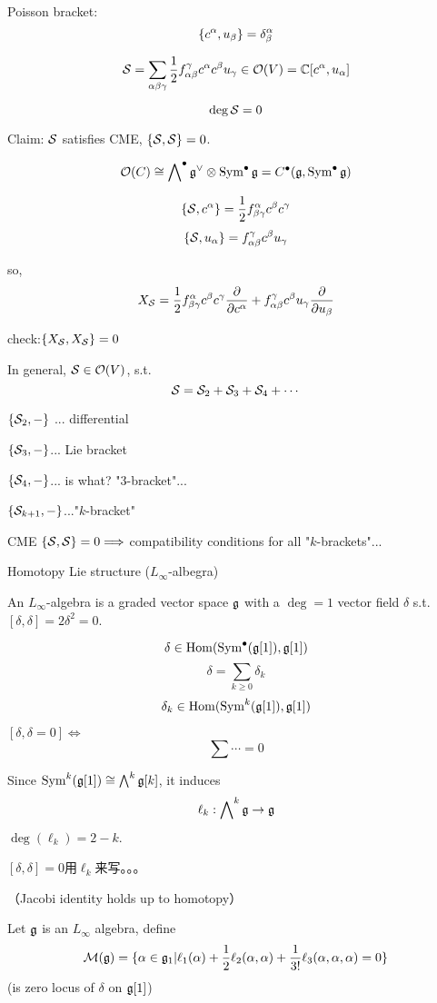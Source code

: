Poisson bracket:
$$\{c^\alpha,u_\beta\}=\delta^\alpha_\beta$$

$$\mathcal{S}=\sum_{\alpha\beta\gamma}
\frac{1}{2}f_{\alpha\beta}^\gamma c^\alpha c^\beta u_\gamma
\in\mathcal{O}(V)=\mathbb{C}[c^\alpha,u_\alpha]
$$

$$\deg\mathcal{S}=0$$

Claim: $\mathcal{S}$ satisfies CME, $\{\mathcal{S},\mathcal{S}\}=0$.

$$\mathcal{O}(C)\cong \bigwedge\nolimits^{\bullet}\mathfrak{g}^\vee\otimes\operatorname{Sym}^{\bullet}\mathfrak{g}
=C^{\bullet}(\mathfrak{g},\operatorname{Sym}^{\bullet}\mathfrak{g})
$$

$$\{\mathcal{S},c^\alpha\}=\frac{1}{2}f^\alpha_{\beta\gamma}c^\beta c^\gamma$$
$$\{\mathcal{S},u_\alpha\}=f^\gamma_{\alpha\beta}c^\beta u_\gamma$$

so,
$$X_{\mathcal{S}}=\frac{1}{2}f^\alpha_{\beta\gamma}c^\beta c^\gamma\frac{\partial } {\partial c^\alpha}
+f^\gamma_{\alpha\beta}c^\beta u_\gamma\frac{\partial } {\partial u_\beta}
$$

check:$\{X_{\mathcal{S}},X_{\mathcal{S}}\}=0$
\vs

In general, $\mathcal{S}\in\mathcal{O}(V)$, s.t.
$$\mathcal{S}=\mathcal{S}_2+\mathcal{S}_3+\mathcal{S}_4+\cdots$$

$\{\mathcal{S}_2,-\}$ ... differential

$\{\mathcal{S}_3,-\}$... Lie bracket

$\{\mathcal{S}_4,-\}$... is what? "3-bracket"...

$\{\mathcal{S}_{k+1},-\}$..."$k$-bracket"

CME $\{\mathcal{S},\mathcal{S}\}=0\Longrightarrow$ compatibility conditions for all "$k$-brackets"...

Homotopy Lie structure ($L_\infty$-albegra)

\begin{definition}
An $L_\infty$-algebra is a graded vector space $\mathfrak{g}$ with
a $\deg=1$ vector field $\delta$ s.t. $[\delta,\delta]=2\delta^2=0$.
\end{definition}
$$\delta\in\operatorname{Hom}(\operatorname{Sym}^{\bullet}(\mathfrak{g}[1]),\mathfrak{g}[1])$$
$$\delta=\sum_{k\geq 0}\delta_k$$
$$\delta_k\in\operatorname{Hom}(\operatorname{Sym}^k(\mathfrak{g}[1]),\mathfrak{g}[1])$$

$[\delta,\delta=0]\iff$
$$\sum\cdots=0$$

Since $\operatorname{Sym}^k(\mathfrak{g}[1])\cong\bigwedge\nolimits^{k}\mathfrak{g}[k]$, it induces
$$\ell_k:\bigwedge\nolimits^{k}\mathfrak{g}\to\mathfrak{g}$$
$\deg(\ell_k)=2-k$.

$[\delta,\delta]=0$用$\ell_k$来写。。。

（Jacobi identity holds up to homotopy）

Let $\mathfrak{g}$ is an $L_\infty$ algebra, define
$$\mathcal{M}(\mathfrak{g})=\{\alpha\in\mathfrak{g}_1|
\ell_1(\alpha)+\frac{1}{2}\ell_2(\alpha,\alpha)+\frac{1}{3!}\ell_3(\alpha,\alpha,\alpha)=0
\}$$
(is zero locus of $\delta$ on $\mathfrak{g}[1]$)


